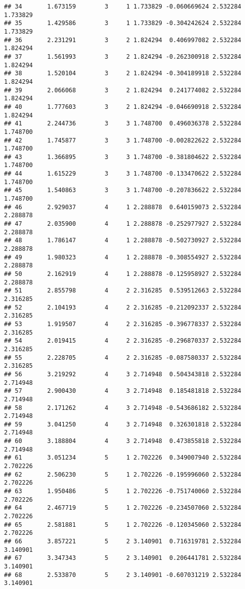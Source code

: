 \documentclass[]{book}
\theoremstyle{definition}
\theoremstyle{definition}
\theoremstyle{definition}
\theoremstyle{remark}
\begin{document}
\begin{verbatim}
## 34       1.673159        3     1 1.733829 -0.060669624 2.532284 1.733829
## 35       1.429586        3     1 1.733829 -0.304242624 2.532284 1.733829
## 36       2.231291        3     2 1.824294  0.406997082 2.532284 1.824294
## 37       1.561993        3     2 1.824294 -0.262300918 2.532284 1.824294
## 38       1.520104        3     2 1.824294 -0.304189918 2.532284 1.824294
## 39       2.066068        3     2 1.824294  0.241774082 2.532284 1.824294
## 40       1.777603        3     2 1.824294 -0.046690918 2.532284 1.824294
## 41       2.244736        3     3 1.748700  0.496036378 2.532284 1.748700
## 42       1.745877        3     3 1.748700 -0.002822622 2.532284 1.748700
## 43       1.366895        3     3 1.748700 -0.381804622 2.532284 1.748700
## 44       1.615229        3     3 1.748700 -0.133470622 2.532284 1.748700
## 45       1.540863        3     3 1.748700 -0.207836622 2.532284 1.748700
## 46       2.929037        4     1 2.288878  0.640159073 2.532284 2.288878
## 47       2.035900        4     1 2.288878 -0.252977927 2.532284 2.288878
## 48       1.786147        4     1 2.288878 -0.502730927 2.532284 2.288878
## 49       1.980323        4     1 2.288878 -0.308554927 2.532284 2.288878
## 50       2.162919        4     1 2.288878 -0.125958927 2.532284 2.288878
## 51       2.855798        4     2 2.316285  0.539512663 2.532284 2.316285
## 52       2.104193        4     2 2.316285 -0.212092337 2.532284 2.316285
## 53       1.919507        4     2 2.316285 -0.396778337 2.532284 2.316285
## 54       2.019415        4     2 2.316285 -0.296870337 2.532284 2.316285
## 55       2.228705        4     2 2.316285 -0.087580337 2.532284 2.316285
## 56       3.219292        4     3 2.714948  0.504343818 2.532284 2.714948
## 57       2.900430        4     3 2.714948  0.185481818 2.532284 2.714948
## 58       2.171262        4     3 2.714948 -0.543686182 2.532284 2.714948
## 59       3.041250        4     3 2.714948  0.326301818 2.532284 2.714948
## 60       3.188804        4     3 2.714948  0.473855818 2.532284 2.714948
## 61       3.051234        5     1 2.702226  0.349007940 2.532284 2.702226
## 62       2.506230        5     1 2.702226 -0.195996060 2.532284 2.702226
## 63       1.950486        5     1 2.702226 -0.751740060 2.532284 2.702226
## 64       2.467719        5     1 2.702226 -0.234507060 2.532284 2.702226
## 65       2.581881        5     1 2.702226 -0.120345060 2.532284 2.702226
## 66       3.857221        5     2 3.140901  0.716319781 2.532284 3.140901
## 67       3.347343        5     2 3.140901  0.206441781 2.532284 3.140901
## 68       2.533870        5     2 3.140901 -0.607031219 2.532284 3.140901

\end{verbatim}
\end{document}
